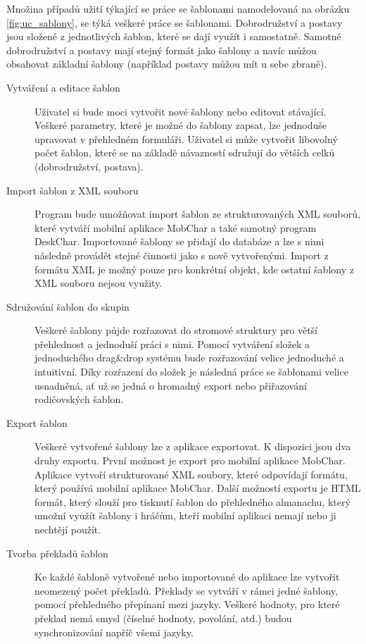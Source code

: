 \documentclass[thesis=B,czech]{resources/FITthesis}[2012/06/26]
\begin{document}
Množina případů užití týkající se práce se šablonami namodelovaná na obrázku \ref{fig:uc_sablony}, se týká veškeré práce se šablonami. Dobrodružství a postavy jsou složené z jednotlivých šablon, které se dají využít i samostatně. Samotné dobrodružství a postavy mají stejný formát jako šablony a navíc můžou obsahovat základní šablony (například postavy můžou mít u sebe zbraně).
\begin{description}
\item[Vytváření a editace šablon] Uživatel si bude moci vytvořit nové šablony nebo editovat stávající. Veškeré parametry, které je možné do šablony zapsat, lze jednoduše upravovat v přehledném formuláři. Uživatel si může vytvořit libovolný počet šablon, které se na základě návazností sdružují do větších celků (dobrodružství, postava).

\item[Import šablon z XML souboru] Program bude umožňovat import šablon ze strukturovaných XML souborů, které vytváří mobilní aplikace MobChar a také samotný program DeskChar. Importované šablony se přidají do databáze a lze s nimi následně provádět stejné činnosti jako s nově vytvořenými. Import z formátu XML je možný pouze pro konkrétní objekt, kde ostatní šablony z XML souboru nejsou využity.

\item[Sdružování šablon do skupin] Veškeré šablony půjde rozřazovat do stromové struktury pro větší přehlednost a jednoduší práci s nimi. Pomocí vytváření složek a jednoduchého drag\&drop systému bude rozřazování velice jednoduché a intuitivní. Díky rozřazení do složek je následná práce se šablonami velice usnadněná, ať už se jedná o hromadný export nebo přiřazování rodičovských šablon.

\item[Export šablon] Veškeré vytvořené šablony lze z aplikace exportovat. K dispozici jsou dva druhy exportu. První možnost je export pro mobilní aplikace MobChar. Aplikace vytvoří strukturované XML soubory, které odpovídají formátu, který používá mobilní aplikace MobChar. Další možností exportu je HTML formát, který slouží pro tisknutí šablon do přehledného almanachu, který umožní využít šablony i hráčům, kteří mobilní aplikaci nemají nebo ji nechtějí použít. 

\item[Tvorba překladů šablon] Ke každé šabloně vytvořené nebo importované do aplikace lze vytvořit neomezený počet překladů. Překlady se vytváří v rámci jedné šablony, pomocí přehledného přepínaní mezi jazyky. Veškeré hodnoty, pro které překlad nemá smysl (číselné hodnoty, povolání, atd.) budou synchronizování napříč všemi jazyky.
\end{description}
\end{document}
